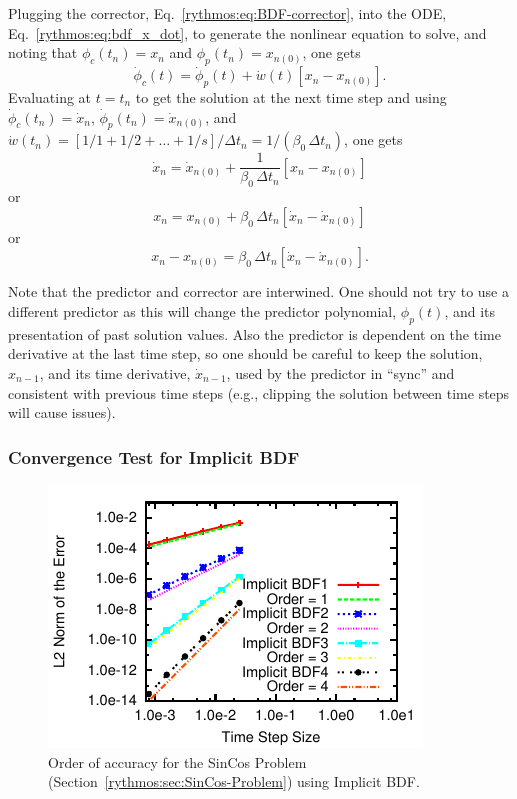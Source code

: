 Plugging the corrector, Eq.~\ref{rythmos:eq:BDF-corrector}, into
the ODE, Eq.~\ref{rythmos:eq:bdf_x_dot}, to generate the nonlinear
equation to solve, and noting that $\phi_{c}(t_{n})=x_{n}$ and $\phi_{p}(t_{n})=x_{n(0)}$,
one gets
\[
\dot{\phi}_{c}(t)=\dot{\phi}_{p}(t)+\dot{w}(t)[x{}_{n}-x_{n(0)}].
\]
Evaluating at $t=t_{n}$ to get the solution at the next time step
and using $\dot{\phi}_{c}(t_{n})=\dot{x}_{n}$, $\dot{\phi}_{p}(t_{n})=\dot{x}_{n(0)}$,
and $\dot{w}(t_{n})=[1/1+1/2+\ldots+1/s]/\Delta t_{n}=1/(\beta_{0}\,\Delta t_{n})$,
one gets
\[
\dot{x}_{n}=\dot{x}_{n(0)}+\frac{1}{\beta_{0}\,\Delta t_{n}}[x{}_{n}-x_{n(0)}]
\]
or
\[
x{}_{n}=x_{n(0)}+\beta_{0}\,\Delta t_{n}[\dot{x}_{n}-\dot{x}_{n(0)}]
\]
or
\[
x{}_{n}-x_{n(0)}=\beta_{0}\,\Delta t_{n}[\dot{x}_{n}-\dot{x}_{n(0)}].
\]


Note that the predictor and corrector are interwined. One should not
try to use a different predictor as this will change the predictor
polynomial, $\phi_{p}(t)$, and its presentation of past solution
values. Also the predictor is dependent on the time derivative at
the last time step, so one should be careful to keep the solution,
$x_{n-1}$, and its time derivative, $\dot{x}_{n-1}$, used by the
predictor in ``sync'' and consistent with previous time steps (e.g.,
clipping the solution between time steps will cause issues).


\subsubsection{Convergence Test for Implicit BDF}

\begin{figure}[H]
\centering{}\includegraphics[scale=1.5]{figures/ImplicitBDF4}\caption{Order of accuracy for the SinCos Problem (Section~\ref{rythmos:sec:SinCos-Problem})
using Implicit BDF.}
\end{figure}

